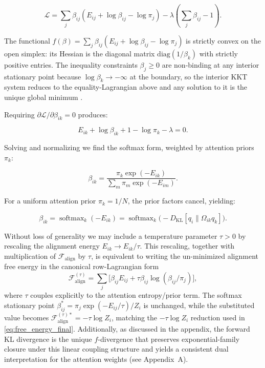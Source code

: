 \documentclass[twoside,11pt]{article}
\begin{document}
\begin{equation}
\mathcal{L} = \sum_j \beta_{ij}(E_{ij} + \log \beta_{ij} - \log \pi_j) - \lambda\left(\sum_j \beta_{ij} - 1\right).
\end{equation}

The functional $f(\beta) = \sum_j \beta_{ij}(E_{ij} + \log\beta_{ij} - \log\pi_j)$ is strictly convex on the open simplex: its Hessian is the diagonal matrix $\mathrm{diag}(1/\beta_k)$ with strictly positive entries. The inequality constraints $\beta_j \geq 0$ are non-binding at any interior stationary point because $\log\beta_k \to -\infty$ at the boundary, so the interior KKT system reduces to the equality-Lagrangian above and any solution to it is the unique global minimum \citep{Boyd2004, Wainwright2008}.

Requiring $\partial \mathcal{L} / \partial \beta_{ik} = 0$ produces:

\begin{equation}
E_{ik} + \log \beta_{ik} + 1 - \log \pi_k - \lambda = 0.
\end{equation}

Solving and normalizing we find the softmax form, weighted by attention priors $\pi_k$:

\begin{equation}
\beta_{ik} = \frac{\pi_k \exp(-E_{ik})}{\sum_m \pi_m \exp(-E_{im})}.
\label{eq:mixture_softmax_general}
\end{equation}

For a uniform attention prior $\pi_k = 1/N$, the prior factors cancel, yielding:

\begin{equation}
\boxed{\beta_{ik} = \operatorname{softmax}_k(-E_{ik}) = \operatorname{softmax}_k \big(-D_{\mathrm{KL}}[q_i \| \Omega_{ik} q_k]\big).}
\label{eq:mixture_softmax}
\end{equation}

Without loss of generality we may include a temperature parameter $\tau > 0$ by rescaling the alignment energy $E_{ik} \to E_{ik}/\tau$. This rescaling, together with multiplication of $\mathcal{F}_{\text{align}}$ by $\tau$, is equivalent to writing the un-minimized alignment free energy in the canonical row-Lagrangian form
\begin{equation}
\mathcal{F}_{\text{align}}^{(\tau)} = \sum_j \big[\beta_{ij} E_{ij} + \tau \beta_{ij}\log(\beta_{ij}/\pi_j)\big],
\label{eq:F_align_canonical_tau}
\end{equation}
where $\tau$ couples explicitly to the attention entropy/prior term. The softmax stationary point $\beta_{ij}^* = \pi_j \exp(-E_{ij}/\tau)/Z_i$ is unchanged, while the substituted value becomes $\mathcal{F}_{\text{align}}^{(\tau)*} = -\tau\log Z_i$, matching the $-\tau\log Z_i$ reduction used in \eqref{eq:free_energy_final}. Additionally, as discussed in the appendix, the forward KL divergence is the unique $f$-divergence that preserves exponential-family closure under this linear coupling structure and yields a consistent dual interpretation for the attention weights (see Appendix~A).
\end{document}
